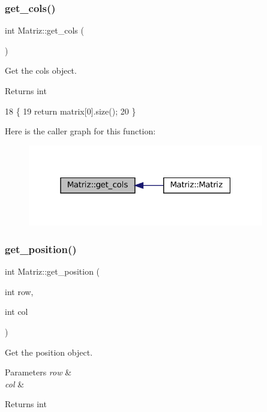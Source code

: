 \subsubsection{\texorpdfstring{get\+\_\+cols()}{get\_cols()}}
{\footnotesize\ttfamily int Matriz\+::get\+\_\+cols (\begin{DoxyParamCaption}{ }\end{DoxyParamCaption})}



Get the cols object. 

\begin{DoxyReturn}{Returns}
int 
\end{DoxyReturn}

\begin{DoxyCode}
18 \{
19   \textcolor{keywordflow}{return} matrix[0].size();
20 \}
\end{DoxyCode}
Here is the caller graph for this function\+:
\nopagebreak
\begin{figure}[H]
\begin{center}
\leavevmode
\includegraphics[width=292pt]{classMatriz_ad6915f9b31f93230a3ce05d01d23a47b_icgraph}
\end{center}
\end{figure}
\mbox{\label{classMatriz_a1894d8447d3ae6992a43e46f93422b88}} 
\subsubsection{\texorpdfstring{get\+\_\+position()}{get\_position()}}
{\footnotesize\ttfamily int Matriz\+::get\+\_\+position (\begin{DoxyParamCaption}\item[{int}]{row,  }\item[{int}]{col }\end{DoxyParamCaption})}



Get the position object. 


\begin{DoxyParams}{Parameters}
{\em row} & \\
\hline
{\em col} & \\
\hline
\end{DoxyParams}
\begin{DoxyReturn}{Returns}
int 
\end{DoxyReturn}

